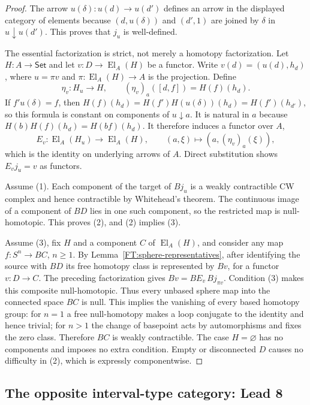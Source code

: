 \begin{proof}
The arrow $u(\delta):u(d)\to u(d')$ defines an arrow in the displayed
category of elements because $(d,u(\delta))$ and $(d',1)$ are joined by
$\delta$ in $u\downarrow u(d')$. This proves that $j_u$ is well-defined.

The essential factorization is strict, not merely a homotopy
factorization. Let $H:A\to\mathsf{Set}$ and let
$v:D\to\operatorname{El}_A(H)$ be a functor. Write
$v(d)=(u(d),h_d)$, where $u=\pi v$ and
$\pi:\operatorname{El}_A(H)\to A$ is the projection. Define
\[
 \eta_v:H_u\longrightarrow H,\qquad
 (\eta_v)_a([d,f])=H(f)(h_d).
\]
If $f'u(\delta)=f$, then
$H(f)(h_d)=H(f')H(u(\delta))(h_d)=H(f')(h_{d'})$, so this formula is
constant on components of $u\downarrow a$. It is natural in $a$ because
$H(b)H(f)(h_d)=H(bf)(h_d)$. It therefore induces a functor over $A$,
\[
 E_v:\operatorname{El}_A(H_u)\longrightarrow
       \operatorname{El}_A(H),\qquad
 (a,\xi)\longmapsto(a,(\eta_v)_a(\xi)),
\]
which is the identity on underlying arrows of $A$. Direct substitution
shows $E_vj_u=v$ as functors.

Assume (1). Each component of the target of $Bj_u$ is a weakly
contractible CW complex and hence contractible by Whitehead's theorem.
The continuous image of a component of $BD$ lies in one such component,
so the restricted map is null-homotopic. This proves (2), and (2)
implies (3).

Assume (3), fix $H$ and a component $C$ of $\operatorname{El}_A(H)$,
and consider any map $f:S^n\to BC$, $n\geq1$. By
Lemma~\ref{FT:sphere-representatives}, after identifying the source with
$BD$ its free homotopy class is represented by $Bv$, for a functor
$v:D\to C$. The preceding factorization gives $Bv=BE_v\,Bj_{\pi v}$.
Condition (3) makes this composite null-homotopic. Thus every unbased
sphere map into the connected space $BC$ is null. This implies the
vanishing of every based homotopy group: for $n=1$ a free null-homotopy
makes a loop conjugate to the identity and hence trivial; for $n>1$ the
change of basepoint acts by automorphisms and fixes the zero class.
Therefore $BC$ is weakly contractible. The case $H=\varnothing$ has no
components and imposes no extra condition. Empty or disconnected $D$
causes no difficulty in (2), which is expressly componentwise.
\end{proof}

\subsection{The opposite interval-type category: Lead 8}

